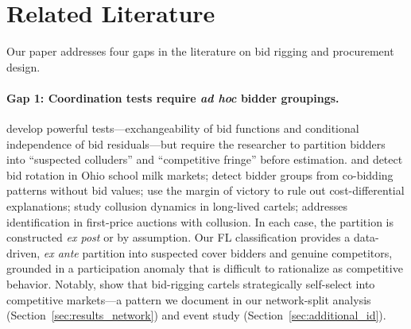 \section{Related Literature}
\label{sec:literature}

Our paper addresses four gaps in the literature on bid rigging and
procurement design.

\paragraph{Gap 1: Coordination tests require \emph{ad hoc} bidder
groupings.}
\citet{bajari2003deciding} develop powerful tests---exchangeability of
bid functions and conditional independence of bid residuals---but
require the researcher to partition bidders into ``suspected
colluders'' and ``competitive fringe'' before estimation.
\citet{porter1993detection} and \citet{porter1999ohio} detect bid
rotation in Ohio school milk markets; \citet{conley2016detecting}
detect bidder groups from co-bidding patterns without bid values;
\citet{kawai2019using} use the margin of victory to rule out
cost-differential explanations;
\citet{clark2021collusion} study collusion dynamics in long-lived
cartels; \citet{schurter2020identification} addresses identification
in first-price auctions with collusion.
In each case, the partition is constructed \emph{ex post} or by
assumption. Our FL classification provides a data-driven,
\emph{ex ante} partition into suspected cover bidders and genuine
competitors, grounded in a participation anomaly that is difficult
to rationalize as competitive behavior.
Notably, \citet{porter1993detection} show that bid-rigging cartels
strategically self-select into competitive markets---a pattern we
document in our network-split analysis
(Section~\ref{sec:results_network}) and event study
(Section~\ref{sec:additional_id}).

